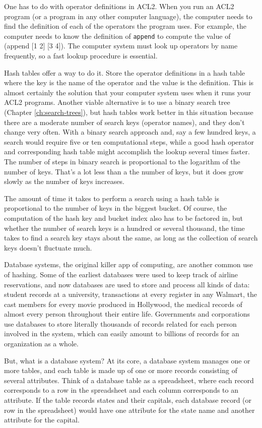 One has to do with operator definitions in ACL2. When
you run an ACL2 program (or a program in any other computer language), 
the computer needs to find the definition of each of the operators
the program uses.
For example, the computer needs to know the definition of
\texttt{append} to compute the value of (append [1 2] [3  4]).
The computer system must look up operators by name frequently,
so a fast lookup procedure is essential.

Hash tables offer a way to do it. Store the operator
definitions in a hash table where the key is the name of the operator
and the value is the definition. This is almost certainly the solution
that your computer system uses when it runs your ACL2 programs. 
Another viable alternative is to use a binary search tree
(Chapter \ref{ch:search-trees}), but hash tables work better
in this situation because there are a moderate number of search keys
(operator names), and they don't change very often.
With a binary search approach and, say a few hundred keys,
a search would require five or ten computational steps,
while a good hash operator and corresponding hash table
might accomplish the lookup several times faster.
The number of steps in binary search is proportional to the
logarithm of the number of keys. That's a lot less than a the
number of keys, but it does grow slowly as the number of keys increases.

The amount of time it takes to perform a search using a hash table
is proportional to the number of keys in the biggest bucket.
Of course, the computation of the hash key and bucket index
also has to be factored in, but whether the number of search keys
is a hundred or several thousand, the time takes to find a search
key stays about the same, as long as the collection of search
keys doesn't fluctuate much.

Database systems, the original killer app of
computing, are another common use of hashing.
Some of the earliest databases were used to keep track
of airline reservations, and now databases are used to store and
process all kinds of data: student records at a university,
transactions at every register in any Walmart, the
cast members for every movie produced in Hollywood,
the medical records of almost every person throughout their entire life.
Governments and corporations use databases to store literally
thousands of records related for each person involved in the system, 
which can easily amount to billions
of records for an organization as a whole.

But, what is a database system? At its core, a database system
manages one or more tables, and each table is made up of one or more
records consisting of several attributes. 
Think of a database table as a
spreadsheet, where each record corresponds to a row in the spreadsheet
and each column corresponds to an attribute. If the table
records states and their capitals, each database
record (or row in the spreadsheet) would have one attribute for the
state name and another attribute for the capital.

